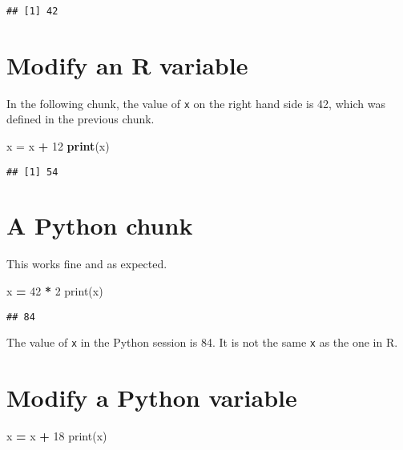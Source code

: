 \documentclass[]{book}
\newenvironment{Shaded}{\begin{snugshade}}{\end{snugshade}}
\newcommand{\BuiltInTok}[1]{#1}
\newcommand{\DecValTok}[1]{\textcolor[rgb]{0.00,0.00,0.81}{#1}}
\newcommand{\KeywordTok}[1]{\textcolor[rgb]{0.13,0.29,0.53}{\textbf{#1}}}
\newcommand{\NormalTok}[1]{#1}
\newcommand{\OperatorTok}[1]{\textcolor[rgb]{0.81,0.36,0.00}{\textbf{#1}}}
\newcommand{\StringTok}[1]{\textcolor[rgb]{0.31,0.60,0.02}{#1}}
\theoremstyle{definition}
\theoremstyle{definition}
\theoremstyle{definition}
\theoremstyle{remark}
\begin{document}
\begin{verbatim}
## [1] 42
\end{verbatim}

\hypertarget{modify-an-r-variable}{%
\section{Modify an R variable}\label{modify-an-r-variable}}

In the following chunk, the value of \texttt{x} on the right hand side
is 42, which was defined in the previous chunk.

\begin{Shaded}
\begin{Highlighting}[]
\NormalTok{x =}\StringTok{ }\NormalTok{x }\OperatorTok{+}\StringTok{ }\DecValTok{12}
\KeywordTok{print}\NormalTok{(x)}
\end{Highlighting}
\end{Shaded}

\begin{verbatim}
## [1] 54
\end{verbatim}

\hypertarget{a-python-chunk}{%
\section{A Python chunk}\label{a-python-chunk}}

This works fine and as expected.

\begin{Shaded}
\begin{Highlighting}[]
\NormalTok{x }\OperatorTok{=} \DecValTok{42} \OperatorTok{*} \DecValTok{2}
\BuiltInTok{print}\NormalTok{(x) }
\end{Highlighting}
\end{Shaded}

\begin{verbatim}
## 84
\end{verbatim}

The value of \texttt{x} in the Python session is 84. It is not the same
\texttt{x} as the one in R.

\hypertarget{modify-a-python-variable}{%
\section{Modify a Python variable}\label{modify-a-python-variable}}

\begin{Shaded}
\begin{Highlighting}[]
\NormalTok{x }\OperatorTok{=}\NormalTok{ x }\OperatorTok{+} \DecValTok{18} 
\BuiltInTok{print}\NormalTok{(x)}
\end{Highlighting}
\end{Shaded}
\end{document}
